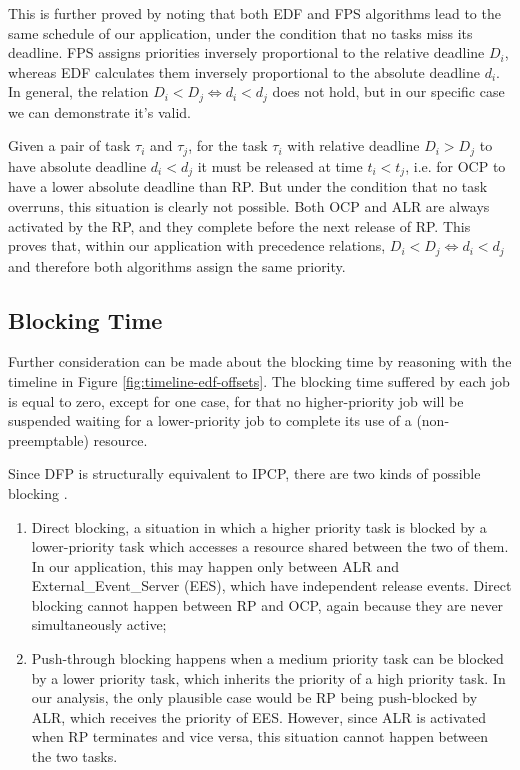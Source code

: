\documentclass{article}
\begin{document}
This is further proved by noting that both EDF and FPS algorithms lead to the same schedule of our application, under the condition that no tasks miss its deadline. FPS assigns priorities inversely proportional to the relative deadline $D_i$, whereas EDF calculates them inversely proportional to the absolute deadline $d_i$. In general, the relation $D_i < D_j \Leftrightarrow d_i < d_j$ does not hold, but in our specific case we can demonstrate it's valid.

Given a pair of task $\tau_i$ and $\tau_j$, for the task $\tau_i$ with relative deadline $D_i > D_j$ to have absolute deadline $d_i < d_j$ it must be released at time $t_i < t_j$, i.e. for OCP to have a lower absolute deadline than RP. But under the condition that no task overruns, this situation is clearly not possible. Both OCP and ALR are always activated by the RP, and they complete before the next release of RP. This proves that, within our application with precedence relations, $D_i < D_j \Leftrightarrow d_i < d_j$ and therefore both algorithms assign the same priority.

\subsection{Blocking Time}\label{edf-blocking-time}
Further consideration can be made about the blocking time by reasoning with the timeline in Figure \ref{fig:timeline-edf-offsets}. The blocking time suffered by each job is equal to zero, except for one case, for that no higher-priority job will be suspended waiting for a lower-priority job to complete its use of a (non-preemptable) resource.

Since DFP is structurally equivalent to IPCP, there are two kinds of possible blocking \cite{ada-pcp}.

\begin{enumerate}
   \item Direct blocking, a situation in which a higher priority task is blocked by a lower-priority task which accesses a resource shared between the two of them. In our application, this may happen only between ALR and External\_Event\_Server (EES), which have independent release events. Direct blocking cannot happen between RP and OCP, again because they are never simultaneously active;
   \item Push-through blocking happens when a medium priority task can be blocked by a lower priority task, which inherits the priority of a high priority task. In our analysis, the only plausible case would be RP being push-blocked by ALR, which receives the priority of EES. However, since ALR is activated when RP terminates and vice versa, this situation cannot happen between the two tasks.
\end{enumerate}
\end{document}
